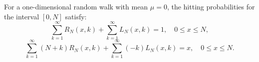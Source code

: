 For a one-dimensional random walk with mean $\mu = 0$, the hitting probabilities for the interval $[0,N]$ satisfy:
$$\sum_{k=1}^{\infty} R_N(x,k) + \sum_{k=1}^{\infty} L_N(x,k) = 1, \quad 0 \leq x \leq N,$$
$$\sum_{k=1}^{\infty} (N+k) R_N(x,k) + \sum_{k=1}^{\infty} (-k) L_N(x,k) = x, \quad 0 \leq x \leq N.$$
